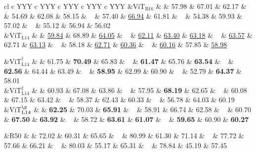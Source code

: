 \begin{table}[!htbp]
\begin{tabularx}{\textwidth}{cl c YYY c YYY c YYY c YYY c YYY}
&{ViT$_{\text{B16}}$} &  & 
57.98 & 67.01 & 62.17  & ~ &
54.69 & 62.08 & 58.15  & ~ &
57.40 & \underline{66.94} & 61.81  & ~ &
54.38 & 59.93 & 57.02  & ~ &
55.12 & 56.94 & 56.02  \\

&{ViT$_{\text{L14}}$} &  & 
\underline{59.84} & 68.89 & \underline{64.05}  & ~ &
\underline{62.11} & \underline{63.40} & \underline{63.18}  & ~ &
\underline{63.57} & 62.71 & \underline{63.13}  & ~ &
58.18 & \underline{62.71} & \underline{60.36}  & ~ &
\underline{60.16} & 57.85 & \underline{58.98}  \\

{}

&{ViT$_{\text{L14}}^\dag$} &  & 
61.75 & \textbf{70.49} & 65.83  &  ~ &
 \textbf{61.47} &  65.76 &  \textbf{63.54}  & ~ &
\textbf{62.56} & 64.44 & 63.49  & ~ &
\textbf{58.95} & 62.99 & 60.90  & ~ &
52.79 & \textbf{64.37} & 58.01  \\

&{ViT$_{\text{L14}}^\ddag$} &  & 
60.93 & 67.08 & 63.86  & ~ &
57.95 & \textbf{68.19} & 62.65  & ~ &
60.08 & 67.15 & 63.42  & ~ &
58.37 & 62.43 & 60.33  & ~ &
56.78 & 64.03 & 60.19  \\

&{ViT$_{\text{L14}}^\S$} &  & 
 \textbf{62.25} &  70.03 &  \textbf{65.91}  & ~ &
58.91 & 66.74 & 62.58  &  ~ &
 60.70 &  \textbf{67.50} &  \textbf{63.92}  &  ~ &
 58.72 &  \textbf{63.61} &  \textbf{61.07}  &  ~ &
 \textbf{59.65} &  60.90 &  \textbf{60.27}  \\


\midrule

\parbox[t]{1mm}{}
&{R50} &  & 
72.02 & 60.31 & 65.65  & ~ &
80.99 & 61.30 & 71.14  & ~ &
77.72 & 57.66 & 66.21  & ~ &
80.03 & 55.17 & 65.31  & ~ &
78.84 & 45.19 & 57.45  \\


\end{tabularx}
\end{table}
